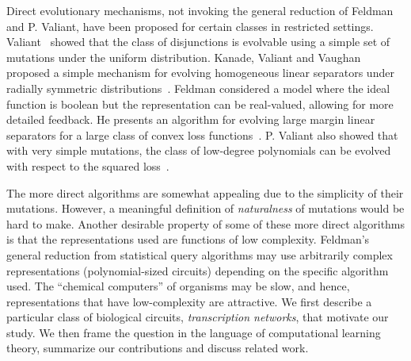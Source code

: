 Direct evolutionary mechanisms, not invoking the general
reduction of Feldman and P. Valiant, have been proposed for certain classes in
restricted settings. Valiant~\cite{Valiant:2009-evolvability} showed that the
class of disjunctions is evolvable using a simple set of mutations under the
uniform distribution. Kanade, Valiant and Vaughan proposed a simple mechanism
for evolving homogeneous linear separators under radially symmetric
distributions~\cite{KVV:2010-drift}.  Feldman considered a model where the ideal
function is boolean but the representation can be real-valued, allowing for more
detailed feedback. He presents an algorithm for evolving large margin linear
separators for a large class of convex loss functions~\cite{Feldman:2011-LTF}.
P. Valiant also showed that with very simple mutations, the class of low-degree
polynomials can be evolved with respect to the squared
loss~\cite{Valiant:2012-real}.

The more direct algorithms are somewhat appealing due to the simplicity of their
mutations.  However, a meaningful definition of \emph{naturalness} of mutations
would be hard to make.
Another desirable property of some of these more direct algorithms is that the
representations used are functions of low complexity. Feldman's general
reduction from statistical query algorithms may use arbitrarily complex
representations (polynomial-sized circuits) depending on the specific algorithm
used. The ``chemical computers'' of organisms may be slow, and hence,
representations that have low-complexity are attractive. We first describe a
particular class of biological circuits, \emph{transcription networks}, that
motivate our study. We then frame the question in the language of computational
learning theory, summarize our contributions and discuss related work.


